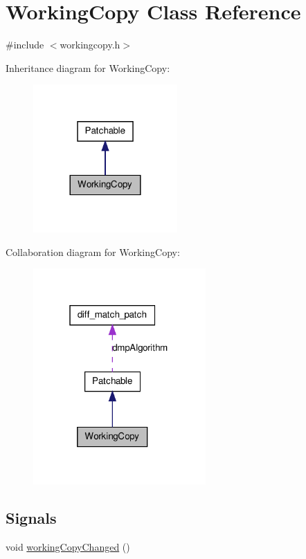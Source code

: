 \hypertarget{class_working_copy}{
\section{WorkingCopy Class Reference}
\label{class_working_copy}
}


{\ttfamily \#include $<$workingcopy.h$>$}



Inheritance diagram for WorkingCopy:\nopagebreak
\begin{figure}[H]
\begin{center}
\leavevmode
\includegraphics[width=156pt]{class_working_copy__inherit__graph}
\end{center}
\end{figure}


Collaboration diagram for WorkingCopy:\nopagebreak
\begin{figure}[H]
\begin{center}
\leavevmode
\includegraphics[width=187pt]{class_working_copy__coll__graph}
\end{center}
\end{figure}
\subsection*{Signals}
\begin{DoxyCompactItemize}
\item 
void \hyperlink{class_working_copy_a6f429f4859aa432ab3f2adf178096b2a}{workingCopyChanged} ()
\end{DoxyCompactItemize}
